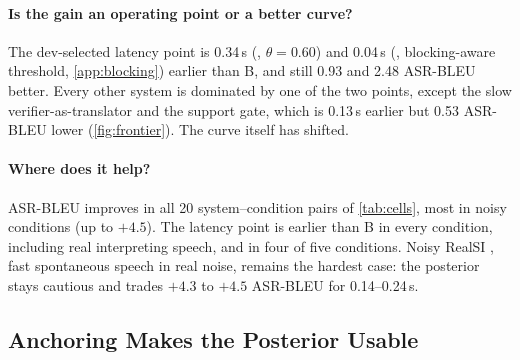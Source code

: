 \paragraph{Is the gain an operating point or a better curve?}
The dev-selected latency point is 0.34\,s (\enzh{}, $\theta = 0.60$) and 0.04\,s (\zhen{}, blocking-aware threshold, \cref{app:blocking}) earlier than B, and still 0.93 and 2.48 ASR-BLEU better.
Every other system is dominated by one of the two \ours{} points, except the slow verifier-as-translator and the \zhen{} support gate, which is 0.13\,s earlier but 0.53 ASR-BLEU lower (\cref{fig:frontier}).
The curve itself has shifted.

\begin{table}[t]
\centering
\caption{Per-condition differences to B: $\Delta$ASR-BLEU / $\Delta$speech LAAL (s).
Bold marks a 95\% paired bootstrap interval that excludes zero.
Absolute B values are in \cref{app:full}.}
\label{tab:cells}
\small
\setlength{\tabcolsep}{3.2pt}
\end{table}

\paragraph{Where does it help?}
ASR-BLEU improves in all 20 system--condition pairs of \cref{tab:cells}, most in noisy conditions (up to $+4.5$).
The latency point is earlier than B in every \enzh{} condition, including real interpreting speech, and in four of five \zhen{} conditions.
Noisy RealSI \zhen{}, fast spontaneous speech in real noise, remains the hardest case: the posterior stays cautious and trades $+4.3$ to $+4.5$ ASR-BLEU for 0.14--0.24\,s.

\subsection{Anchoring Makes the Posterior Usable}
\label{sec:calib}

